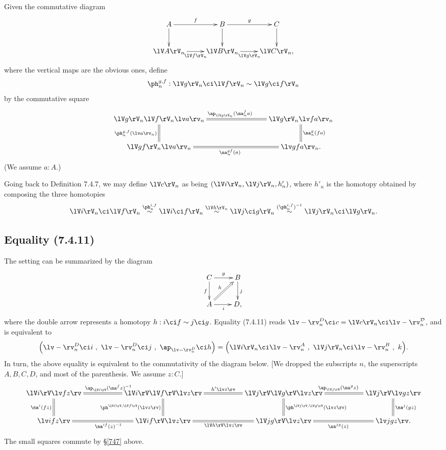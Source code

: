 \documentclass[12pt]{article}
\begin{document}
Given the commutative diagram
$$
\xymatrix{
A\ar[r]^f\ar[d]&B\ar[r]^g\ar[d]&C\ar[d]\\
\lV A\rV_n\ar[r]_{\lV f\rV_n}&\lV B\rV_n\ar[r]_{\lV g\rV_n}&\lV C\rV_n,}
$$ 
where the vertical maps are the obvious ones, define 
$$
\ph_n^{g,f}:\lV g\rV_n\ci\lV f\rV_n\sim\lV g\ci f\rV_n
$$ 
by the commutative square 
$$
\xymatrix{
\lV g\rV_n\lV f\rV_n\lv a\rv_n\ar@{=}[d]_{\ph_n^{g,f}(\lv a\rv_n)}\ar@{=}[rrr]^{\ap_{\lV g\rV_n}(\na_n^fa)}&&&
\lV g\rV_n\lv fa\rv_n\ar@{=}[d]^{\na_n^g(fa)}\\
\lV gf\rV_n\lv a\rv_n\ar@{=}[rrr]_{\na_n^{gf}(a)}&&&\lv gfa\rv_n.}
$$ 
(We assume $a:A$.)

Going back to Definition 7.4.7, we may define $\lV c\rV_n$ as being $(\lV i\rV_n,\lV j\rV_n,h'_n)$, where $h'_n$ is the homotopy obtained by composing the three homotopies
$$
\lV i\rV_n\ci\lV f\rV_n\overset{\ph_n^{i,f}}{\sim}\lV i\ci f\rV_n\overset{\lV h\rV_n}{\sim}\lV j\ci g\rV_n\overset{(\ph_n^{i,f})^{-1}}{\sim}\lV j\rV_n\ci\lV g\rV_n.
$$


\subsection{Equality (7.4.11)}

The setting can be summarized by the diagram 
$$
\xymatrix{C\ar[r]^g\ar[d]_f&B\ar[d]^j\\ A\ar[r]_i\ar@{=>}[ur]^h&D,}
$$ 
where the double arrow represents a homotopy $h:i\ci f\sim j\ci g$. Equality (7.4.11) reads $\lv-\rv^D_n\ci c=\lV c\rV_n\ci\lv-\rv^{\mathcal D}_n$, and is equivalent to
$$
\Big(\lv-\rv^D_n\ci i\ ,\ \lv-\rv^D_n\ci j\ ,\ \ap_{\lv-\rv^D_n}\ci h\Big)
=
\Big(\lV i\rV_n\ci\lv-\rv^A_n\ ,\ \lV j\rV_n\ci\lv-\rv^B_n\ ,\ k\Big).
$$
In turn, the above equality is equivalent to the commutativity of the diagram below. [We dropped the subscripts $n$, the superscripts $A,B,C,D$, and most of the parenthesis. We assume $z:C$.] 
$$ 
\xymatrix{
\lV i\rV\lv fz\rv\ar@{=}[d]_{\na^i(fz)}&&
\lV i\rV\lV f\rV\lv z\rv\ar@{=}[ll]_{\ap_{\lV i\rV}(\na^fz)^{-1}}\ar@{=}[d]_{\ph^{\lV i\rV,\lV f\rV}(\lv z\rv)}\ar@{=}[rr]^{h'\lv z\rv}&&
\lV j\rV\lV g\rV\lv z\rv\ar@{=}[d]^{\ph^{\lV j\rV,\lV g\rV}(\lv z\rv)}\ar@{=}[rr]^{\ap_{\lV j\rV}(\na^gz)}&&
\lV j\rV\lv gz\rv\ar@{=}[d]^{\na^j(gz)}\\
%
\lv ifz\rv&&\lV if\rV\lv z\rv\ar@{=}[rr]_{\lV h\rV\lv z\rv}\ar@{=}[ll]^{\na^{if}(z)^{-1}}&&\lV jg\rV\lv z\rv\ar@{=}[rr]_{\na^{jg}(z)}&&\lv jgz\rv.}
$$ 
The small squares commute by \S\ref{747} above.
\end{document}
